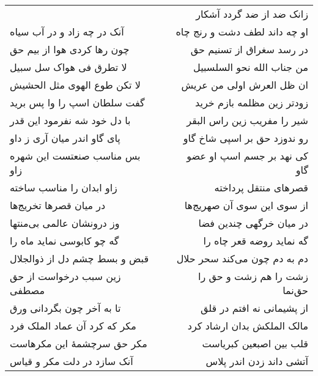 \begin{center}
\begin{longtable}{l p{0.5cm} r}
&&
زانک ضد از ضد گردد آشکار
\\
آنک در چه زاد و در آب سیاه
&&
او چه داند لطف دشت و رنج چاه
\\
چون رها کردی هوا از بیم حق
&&
در رسد سغراق از تسنیم حق
\\
لا تطرق فی هواک سل سبیل
&&
من جناب الله نحو السلسبیل
\\
لا تکن طوع الهوی مثل الحشیش
&&
ان ظل العرش اولی من عریش
\\
گفت سلطان اسپ را وا پس برید
&&
زودتر زین مظلمه بازم خرید
\\
با دل خود شه نفرمود این قدر
&&
شیر را مفریب زین راس البقر
\\
پای گاو اندر میان آری ز داو
&&
رو ندوزد حق بر اسپی شاخ گاو
\\
بس مناسب صنعتست این شهره زاو
&&
کی نهد بر جسم اسپ او عضو گاو
\\
زاو ابدان را مناسب ساخته
&&
قصرهای منتقل پرداخته
\\
در میان قصرها تخریج‌ها
&&
از سوی این سوی آن صهریج‌ها
\\
وز درونشان عالمی بی‌منتها
&&
در میان خرگهی چندین فضا
\\
گه چو کابوسی نماید ماه را
&&
گه نماید روضه قعر چاه را
\\
قبض و بسط چشم دل از ذوالجلال
&&
دم به دم چون می‌کند سحر حلال
\\
زین سبب درخواست از حق مصطفی
&&
زشت را هم زشت و حق را حق‌نما
\\
تا به آخر چون بگردانی ورق
&&
از پشیمانی نه افتم در قلق
\\
مکر که کرد آن عماد الملک فرد
&&
مالک الملکش بدان ارشاد کرد
\\
مکر حق سرچشمهٔ این مکرهاست
&&
قلب بین اصبعین کبریاست
\\
آنک سازد در دلت مکر و قیاس
&&
آتشی داند زدن اندر پلاس
\\
\end{longtable}
\end{center}
